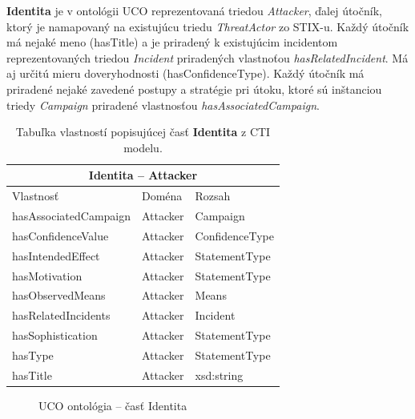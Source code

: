 \documentclass[12pt, a4paper, oneside]{book}
\begin{document}
\textbf{Identita} je v ontológii UCO reprezentovaná triedou \textit{Attacker}, ďalej útočník, ktorý je namapovaný na existujúcu triedu \textit{ThreatActor} zo STIX-u.
%
%
Každý útočník má nejaké meno (hasTitle) a je priradený k existujúcim incidentom reprezentovaných triedou \textit{Incident} priradených vlastnoťou \textit{hasRelatedIncident}. Má aj určitú mieru doveryhodnosti (hasConfidenceType). Každý útočník má priradené nejaké zavedené postupy a stratégie pri útoku, ktoré sú inštanciou triedy \textit{Campaign} priradené vlastnosťou \textit{hasAssociatedCampaign}.
%
%
\begin{table}[hbt!]
\centering
\begin{tabular}{ |p{5cm}||p{3cm}|p{3cm}|  }
 \hline
 \multicolumn{3}{|c|}{Identita -- Attacker} \\
 \hline
 Vlastnosť & Doména & Rozsah\\
 \hline
 hasAssociatedCampaign & Attacker & Campaign\\
 hasConfidenceValue & Attacker & ConfidenceType\\
 hasIntendedEffect & Attacker & StatementType\\
 hasMotivation & Attacker & StatementType\\
 hasObservedMeans & Attacker & Means\\
 hasRelatedIncidents & Attacker & Incident\\
 hasSophistication & Attacker & StatementType\\
 hasType & Attacker & StatementType\\
 hasTitle & Attacker & xsd:string\\
 \hline
\end{tabular}
\caption{Tabuľka vlastností popisujúcej časť \textbf{Identita} z CTI modelu.}
\label{tab:template}
\end{table}
\begin{figure}
\label{fig:semantic_web}
\caption{UCO ontológia -- časť Identita}
\end{figure}
\end{document}
